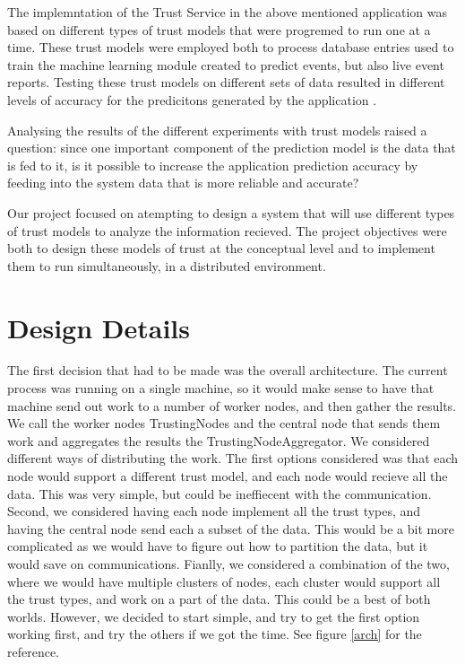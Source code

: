 \documentclass[11pt]{article}
\begin{document}
The implemntation of the Trust Service in the above mentioned application was based on different types of trust models that were progremed to run one at a time. These trust models were employed both to process database entries used to train the machine learning module created to predict events, but also live event reports. Testing these trust models on different sets of data resulted in different levels of accuracy for the predicitons generated by the application \cite[p.~44-45]{trust}.

Analysing the results of the different experiments with trust models raised a question: since one important component of the prediction model is the data that is fed to it, is it possible to increase the application prediction accuracy by feeding into the system data that is more reliable and accurate?

Our project focused on atempting to design a system that will use different types of trust models to analyze the information recieved. The project objectives were both to design these models of trust at the conceptual level and to implement them to run simultaneously, in a distributed environment.

\section{Design Details}

The first decision that had to be made was the overall architecture. The current process was running on a single machine, so it would make sense to have that machine send out work to a number of worker nodes, and then gather the results. We call the worker nodes TrustingNodes and the central node that sends them work and aggregates the results the TrustingNodeAggregator. We considered different ways of distributing the work. The first options considered was that each node would support a different trust model, and each node would recieve all the data. This was very simple, but could be ineffiecent with the communication. Second, we considered having each node implement all the trust types, and having the central node send each a subset of the data. This would be a bit more complicated as we would have to figure out how to partition the data, but it would save on communications. Fianlly, we considered a combination of the two, where we would have multiple clusters of nodes, each cluster would support all the trust types, and work on a part of the data. This could be a best of both worlds. However, we decided to start simple, and try to get the first option working first, and try the others if we got the time. See figure \ref{arch} for the reference.
\end{document}
